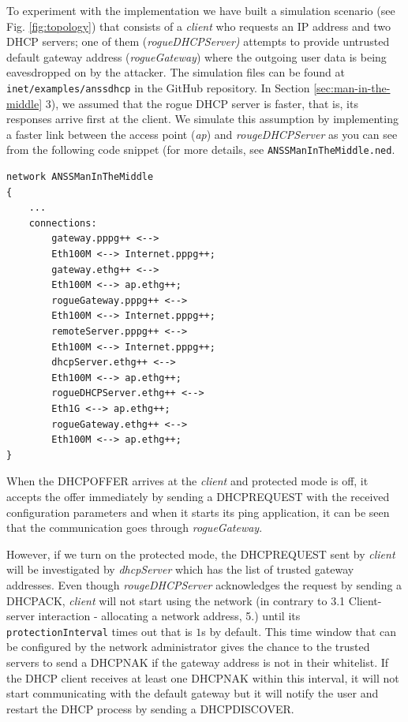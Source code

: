 \documentclass[letterpaper, 10 pt, conference]{ieeeconf}  %
\begin{document}
To experiment with the implementation we have built a simulation scenario (see Fig. \ref{fig:topology}) that consists of a \textit{client} who requests an IP address and two DHCP servers; one of them (\textit{rogueDHCPServer)} attempts to provide untrusted default gateway address (\textit{rogueGateway}) where the outgoing user data is being eavesdropped on by the attacker. The simulation files can be found at \texttt{inet/examples/anssdhcp} in the GitHub repository. In Section \ref{sec:man-in-the-middle} 3), we assumed that the rogue DHCP server is faster, that is, its responses arrive first at the client. We simulate this assumption by implementing a faster link between the access point (\textit{ap}) and \textit{rougeDHCPServer} as you can see from the following code snippet (for more details, see \texttt{ANSSManInTheMiddle.ned}.
\begin{verbatim}
network ANSSManInTheMiddle
{
	...
    connections:
        gateway.pppg++ <--> 
        Eth100M <--> Internet.pppg++;
        gateway.ethg++ <--> 
        Eth100M <--> ap.ethg++;
        rogueGateway.pppg++ <--> 
        Eth100M <--> Internet.pppg++;
        remoteServer.pppg++ <--> 
        Eth100M <--> Internet.pppg++;
        dhcpServer.ethg++ <--> 
        Eth100M <--> ap.ethg++;
        rogueDHCPServer.ethg++ <--> 
        Eth1G <--> ap.ethg++;
        rogueGateway.ethg++ <--> 
        Eth100M <--> ap.ethg++;
}
\end{verbatim}
When the DHCPOFFER arrives at the \textit{client} and protected mode is off, it accepts the offer immediately by sending a DHCPREQUEST with the received configuration parameters and when it starts its ping application, it can be seen that the communication goes through \textit{rogueGateway}.

However, if we turn on the protected mode, the DHCPREQUEST sent by \textit{client} will be investigated by \textit{dhcpServer} which has the list of trusted gateway addresses. Even though \textit{rougeDHCPServer} acknowledges the request by sending a DHCPACK, \textit{client} will not start using the network (in contrary to \cite{dhcprfc} 3.1 Client-server interaction - allocating a network address, 5.) until its \texttt{protectionInterval} times out that is $1$s by default. This time window that can be configured by the network administrator gives the chance to the trusted servers to send a DHCPNAK if the gateway address is not in their whitelist. If the DHCP client receives at least one DHCPNAK within this interval, it will not start communicating with the default gateway but it will notify the user and restart the DHCP process by sending a DHCPDISCOVER.
\end{document}
